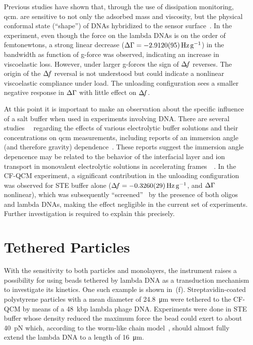 Previous studies have shown that, through the use of dissipation
monitoring, \gls{qcm}. are sensitive to not only the adsorbed mass and viscosity,
but the physical conformal state (``shape'') of DNAs hybridized to the
sensor surface~\cite{tsortos2008shear}.  In the experiment, even though the
force on the lambda DNAs is on the order of femtonewtons, a strong linear
decrease ($\dg=\SI{-2.9120(95)}{\hertz\per\g}$) in the bandwidth as
function of g-force was observed, indicating an increase in viscoelastic
loss.  However, under larger g-forces the sign of $\Delta\!f$ reverses.  The
origin of the $\Delta\!f$ reversal is not understood but could indicate a
nonlinear viscoelastic compliance under load.  The unloading configuration
sees a smaller negative response in $\Delta\Gamma$ with little effect on $\Delta\!f$.

At this point it is important to make an observation about the specific
influence of a salt buffer when used in experiments involving DNA\@.  There
are several studies~\cite{encarnaccao2007influence}~\cite{lin1995role}
regarding the effects of various electrolytic buffer solutions and their
concentrations on \gls{qcm} measurements, including reports of an immersion angle
(and therefore gravity) dependence~\cite{yoshimoto2006characteristics}.  These
reports suggest the immersion angle depencence may be related to the behavior
of the interfacial layer and ion transport in monovalent electrolytic
solutions in accelerating
frames~\cite{tolman1911electromotive}~\cite{des1893unpolarisirbare}.  In the
CF-QCM experiment, a significant contribution in the unloading configuration
was observed for STE buffer alone ($\df=\SI{-0.3260(29)}{\hertz\per\g}$,
and $\Delta\Gamma$ nonlinear), which was subsequently
``screened''~\cite{zhang2002insulating} by the presence of both oligos and
lambda DNAs, making the effect negligible in the current set of experiments.
Further investigation is required to explain this precisely.

\section{Tethered Particles}
With the sensitivity to both particles and monolayers, the instrument
raises a possibility for using beads tethered by lambda DNA as a
transduction mechanism to investigate its kinetics.  One such example is
shown in \,(f).  Streptavidin-coated polystyrene
particles with a mean diameter of \SI{24.8}{\micro\meter} were tethered to
the CF-QCM by means of a \SI{48}{kbp} lambda phage DNA\@.  Experiments were
done in STE buffer whose density reduced the maximum force the bead could
exert to about \SI{40}{\pico\newton} which, according to the worm-like
chain model~\cite{marko1995stretching}, should almost fully extend the
lambda DNA to a length of \SI{16}{\micro\meter}.

